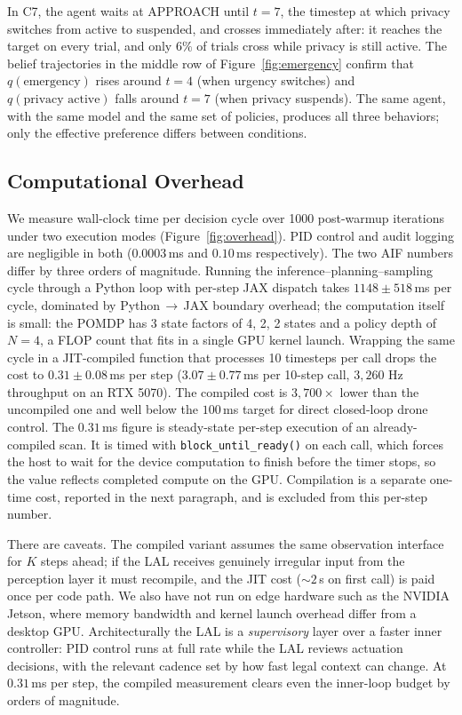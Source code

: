 \documentclass[10pt,twocolumn]{article}
\begin{document}
 In C7, the agent waits at APPROACH until $t{=}7$, the timestep at which privacy switches from active to suspended, and crosses immediately after: it reaches the target on every trial, and only $6\%$ of trials cross while privacy is still active. The belief trajectories in the middle row of Figure~\ref{fig:emergency} confirm that $q(\text{emergency})$ rises around $t{=}4$ (when urgency switches) and $q(\text{privacy active})$ falls around $t{=}7$ (when privacy suspends). The same agent, with the same model and the same set of policies, produces all three behaviors; only the effective preference differs between conditions.

\subsection{Computational Overhead}

We measure wall-clock time per decision cycle over 1000 post-warmup iterations under two execution modes (Figure~\ref{fig:overhead}). PID control and audit logging are negligible in both ($0.0003\,$ms and $0.10\,$ms respectively). The two AIF numbers differ by three orders of magnitude. Running the inference--planning--sampling cycle through a Python loop with per-step JAX dispatch takes $1148 \pm 518\,$ms per cycle, dominated by Python$\,\to\,$JAX boundary overhead; the computation itself is small: the POMDP has 3 state factors of 4, 2, 2 states and a policy depth of $N{=}4$, a FLOP count that fits in a single GPU kernel launch. Wrapping the same cycle in a JIT-compiled function that processes 10 timesteps per call drops the cost to $0.31 \pm 0.08\,$ms per step ($3.07 \pm 0.77\,$ms per 10-step call, $3{,}260$ Hz throughput on an RTX 5070). The compiled cost is $3{,}700\times$ lower than the uncompiled one and well below the $100\,$ms target for direct closed-loop drone control. The $0.31\,$ms figure is steady-state per-step execution of an already-compiled scan. It is timed with \texttt{block\_until\_ready()} on each call, which forces the host to wait for the device computation to finish before the timer stops, so the value reflects completed compute on the GPU. Compilation is a separate one-time cost, reported in the next paragraph, and is excluded from this per-step number.

There are caveats. The compiled variant assumes the same observation interface for $K$ steps ahead; if the LAL receives genuinely irregular input from the perception layer it must recompile, and the JIT cost ($\sim2\,$s on first call) is paid once per code path. We also have not run on edge hardware such as the NVIDIA Jetson, where memory bandwidth and kernel launch overhead differ from a desktop GPU. Architecturally the LAL is a \textit{supervisory} layer over a faster inner controller: PID control runs at full rate while the LAL reviews actuation decisions, with the relevant cadence set by how fast legal context can change. At $0.31\,$ms per step, the compiled measurement clears even the inner-loop budget by orders of magnitude.
\end{document}
